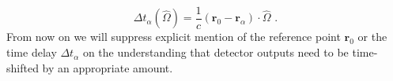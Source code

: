 \documentclass[12pt,twoside,a4paper]{report}
\newcommand{\fs}{\text{ .}}
\begin{document}
\begin{equation}
\Delta t_\alpha (\hat{\Omega})=\frac{1}{c}(\textbf{r}_0-\textbf{r}_\alpha)\cdot\hat{\Omega} \fs
\end{equation}
From now on we will suppress explicit mention of the reference point $\textbf{r}_0$ or the time delay $\Delta t_\alpha$ on the understanding that detector outputs need to be time-shifted by an appropriate amount. 
\end{document}

